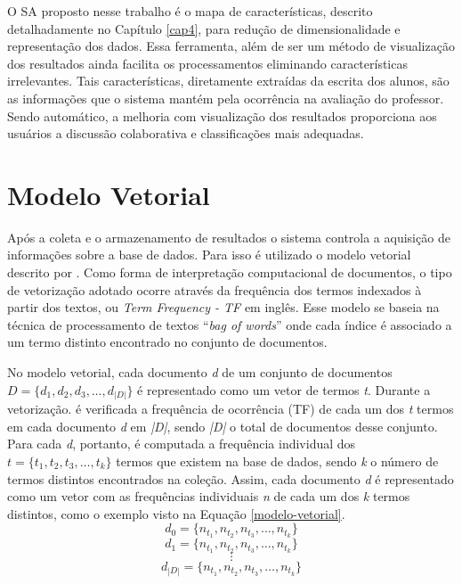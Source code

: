 O SA proposto nesse trabalho é o mapa de características, descrito detalhadamente no Capítulo \ref{cap4}, para redução de dimensionalidade e representação dos dados. Essa ferramenta, além de ser um método de visualização dos resultados ainda facilita os processamentos eliminando características irrelevantes. Tais características, diretamente extraídas da escrita dos alunos, são as informações que o sistema mantém pela ocorrência na avaliação do professor. Sendo automático, a melhoria com visualização dos resultados proporciona aos usuários a discussão colaborativa e classificações mais adequadas.

\section{Modelo Vetorial}\label{modelo_vetorial}
Após a coleta e o armazenamento de resultados o sistema controla a aquisição de informações sobre a base de dados. Para isso é utilizado o modelo vetorial descrito por \cite{salton1975}. Como forma de interpretação computacional de documentos, o tipo de vetorização adotado ocorre através da frequência dos termos indexados à partir dos textos, ou \textit{Term Frequency - TF} em inglês. Esse modelo se baseia na técnica de processamento de textos ``\textit{bag of words}'' onde cada índice é associado a um termo distinto encontrado no conjunto de documentos.

No modelo vetorial, cada documento \textit{d} de um conjunto de documentos $ D = \{ d_{1} , d_{2} , d_{3} , \dots , d_{|D|} \} $ é representado como um vetor de termos \textit{t}. Durante a vetorização. é verificada a frequência de ocorrência (TF) de cada um dos \textit{t} termos em cada documento \textit{d} em \textit{|D|}, sendo \textit{|D|} o total de documentos desse conjunto. Para cada \textit{d}, portanto, é computada a frequência individual dos $ t = \{ t_{1}, t_{2}, t_{3}, \dots , t_{k} \} $ termos que existem na base de dados, sendo \textit{k} o número de termos distintos encontrados na coleção. Assim, cada documento \textit{d} é representado como um vetor com as frequências individuais \textit{n} de cada um dos \textit{k} termos distintos, como o exemplo visto na Equação \ref{modelo-vetorial}.
\begin{equation*}
d_{0} = \{ n_{t_{1}} , n_{t_{2}} , n_{t_{3}} , \dots , n_{t_{k}} \}
\end{equation*}
\begin{equation*}
d_{1} = \{ n_{t_{1}} , n_{t_{2}} , n_{t_{3}} , \dots , n_{t_{k}} \}
\end{equation*}
\[\vdots \]
\begin{equation}
d_{|D|} = \{ n_{t_{1}} , n_{t_{2}} , n_{t_{3}} , \dots , n_{t_{k}} \}
\label{modelo-vetorial}
\end{equation}

